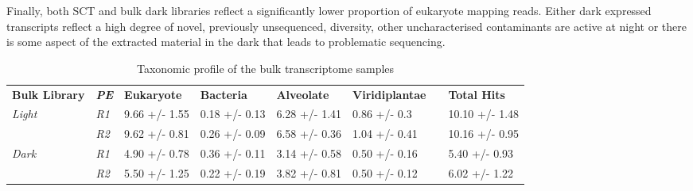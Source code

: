 Finally, both SCT and bulk dark libraries reflect a significantly lower proportion of eukaryote mapping reads. Either dark expressed transcripts 
reflect a high degree of novel, previously unsequenced, diversity, other uncharacterised contaminants are active at night or there is some aspect
of the extracted material in the dark that leads to problematic sequencing.  


\begin{table}[h]
     \begin{tabular}{@{}|l|l|l|l|l|l|l|l|@{}}
         \cmidrule(r){1-6} \cmidrule(l){8-8}
         \textbf{Bulk Library} & \textit{\textbf{PE}} & \textbf{Eukaryote} & \textbf{Bacteria} & \textbf{Alveolate} & \textbf{Viridiplantae} &  & \textbf{Total Hits} \\ \cmidrule(r){1-6} \cmidrule(l){8-8} 
         \textit{Light}    & \textit{R1}              &  9.66 +/- 1.55     & 0.18 +/- 0.13     &  6.28 +/- 1.41     &  0.86 +/- 0.3          &  &  10.10 +/- 1.48       \\ \cmidrule(lr){2-2}
                              & \textit{R2}           &  9.62 +/- 0.81     & 0.26 +/- 0.09    &  6.58 +/- 0.36     &  1.04 +/- 0.41         &  &  10.16 +/- 0.95      \\ \cmidrule(r){1-6} \cmidrule(l){8-8} 
         \textit{Dark}   & \textit{R1}                &  4.90 +/- 0.78     & 0.36 +/- 0.11    &  3.14 +/- 0.58     &  0.50 +/- 0.16        &  &  5.40 +/- 0.93      \\ \cmidrule(lr){2-2}
                              & \textit{R2}           &  5.50 +/- 1.25     & 0.22 +/- 0.19   &  3.82 +/- 0.81     &  0.50 +/- 0.12         &  &  6.02 +/- 1.22      \\ \cmidrule(r){1-6} \cmidrule(l){8-8} 
    \end{tabular}
    \caption{Taxonomic profile of the bulk transcriptome samples}
    \label{tab:bulk_duey}
\end{table}

